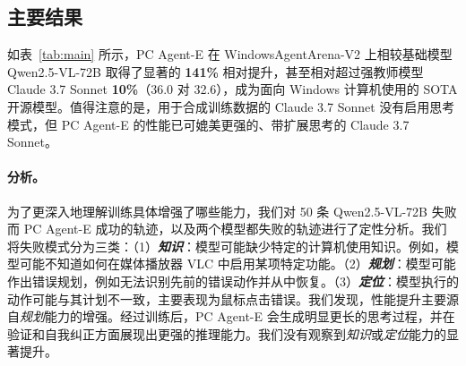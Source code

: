 \documentclass[10pt]{article}
\begin{document}
\subsection{主要结果}
\label{subsec:main_res}

如表~\ref{tab:main} 所示，PC Agent-E 在 WindowsAgentArena-V2 上相较基础模型 Qwen2.5-VL-72B 取得了显著的 \textbf{141\%} 相对提升，甚至相对超过强教师模型 Claude 3.7 Sonnet \textbf{10\%}（36.0 对 32.6），成为面向 Windows 计算机使用的 SOTA 开源模型。值得注意的是，用于合成训练数据的 Claude 3.7 Sonnet 没有启用思考模式，但 PC Agent-E 的性能已可媲美更强的、带扩展思考的 Claude 3.7 Sonnet。

\begin{table}[t]
\centering
{}
\caption{不同模型在 WindowsAgentArena-V2 上的成功率（\%）。}
\label{tab:main}
\end{table}

\paragraph{分析。}
为了更深入地理解训练具体增强了哪些能力，我们对 50 条 Qwen2.5-VL-72B 失败而 PC Agent-E 成功的轨迹，以及两个模型都失败的轨迹进行了定性分析。我们将失败模式分为三类：（1）\textbf{\textit{知识}}：模型可能缺少特定的计算机使用知识。例如，模型可能不知道如何在媒体播放器 VLC 中启用某项特定功能。（2）\textbf{\textit{规划}}：模型可能作出错误规划，例如无法识别先前的错误动作并从中恢复。（3）\textbf{\textit{定位}}：模型执行的动作可能与其计划不一致，主要表现为鼠标点击错误。我们发现，性能提升主要源自\textit{规划}能力的增强。经过训练后，PC Agent-E 会生成明显更长的思考过程，并在验证和自我纠正方面展现出更强的推理能力。我们没有观察到\textit{知识}或\textit{定位}能力的显著提升。
\end{document}
